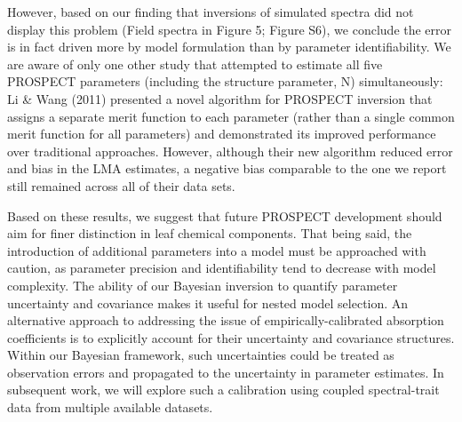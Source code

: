 However, based on our finding that inversions of simulated spectra did not display this problem (Field spectra in Figure 5; Figure S6), we conclude the error is in fact driven more by model formulation than by parameter identifiability. %
We are aware of only one other study that attempted to estimate all five PROSPECT parameters (including the structure parameter, N) simultaneously: \nocite{li_2011_retrieval}
Li \& Wang (2011) presented a novel algorithm for PROSPECT inversion that assigns a separate merit function to each parameter (rather than a single common merit function for all parameters) and demonstrated its improved performance over traditional approaches.
However, although their new algorithm reduced error and bias in the LMA estimates, a negative bias comparable to the one we report still remained across all of their data sets. 

Based on these results, we suggest that future PROSPECT development should aim for finer distinction in leaf chemical components.
That being said, the introduction of additional parameters into a model must be approached with caution, as parameter precision and identifiability tend to decrease with model complexity.
The ability of our Bayesian inversion to quantify parameter uncertainty and covariance makes it useful for nested model selection.
An alternative approach to addressing the issue of empirically-calibrated absorption coefficients is to explicitly account for their uncertainty and covariance structures. 
Within our Bayesian framework, such uncertainties could be treated as observation errors and propagated to the uncertainty in parameter estimates.
In subsequent work, we will explore such a calibration using coupled spectral-trait data from multiple available datasets.

